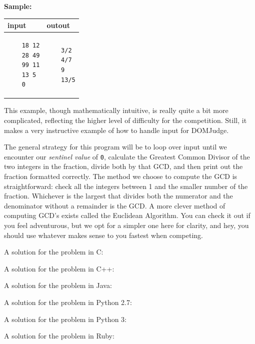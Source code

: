 \documentclass[a4paper]{article}
\begin{document}
\textbf{Sample:}

\begin{tabular}{|p{}|p{}|}
    \hline
    \textbf{input} & \textbf{outout} \\
    \hline
    \begin{verbatim}
    18 12
    28 49
    99 11
    13 5
    0
    \end{verbatim} &
    \begin{verbatim}
    3/2
    4/7
    9
    13/5
    \end{verbatim} \\
    \hline
\end{tabular}

This example, though mathematically intuitive, is really quite a bit more complicated, reflecting the higher level of difficulty for the competition. Still, it makes a very instructive example of how to handle input for DOMJudge. 

The general strategy for this program will be to loop over input until we encounter our \textit{sentinel value} of \texttt{0}, calculate the Greatest Common Divisor of the two integers in the fraction, divide both by that GCD, and then print out the fraction formatted correctly. The method we choose to compute the GCD is straightforward: check all the integers between 1 and the smaller number of the fraction. Whichever is the largest that divides both the numerator and the denominator without a remainder is the GCD. A more clever method of computing GCD's exists called the Euclidean Algorithm. You can check it out if you feel adventurous, but we opt for a simpler one here for clarity, and hey, you should use whatever makes sense to you fastest when competing. 
\newpage

A solution for the problem in C:

\newpage

A solution for the problem in C++:

\newpage

A solution for the problem in Java:

\newpage

A solution for the problem in Python 2.7:

\newpage

A solution for the problem in Python 3:

\newpage

A solution for the problem in Ruby:

\end{document}
